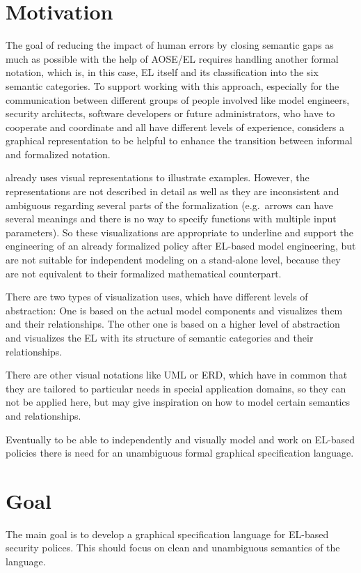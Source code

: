 \documentclass[twoside, openright, 12pt]{book}
\begin{document}
\section{Motivation} 
\label{motivation}
The goal of reducing the impact of human errors by closing semantic gaps as much as possible with the help of AOSE/EL requires handling another formal notation, which is, in this case, EL itself and its classification into the six semantic categories.
To support working with this approach, especially for the communication between different groups of people involved like model engineers, security architects, software developers or future administrators, who have to cooperate and coordinate and all have different levels of experience, \citet*{Amthor18} considers a graphical representation to be helpful to enhance the transition between informal and formalized notation.

\citet*{Amthor18} already uses visual representations to illustrate examples.
However, the representations are not described in detail as well as they are inconsistent and ambiguous regarding several parts of the formalization (e.g.\ arrows can have several meanings and there is no way to specify functions with multiple input parameters).
So these visualizations are appropriate to underline and support the engineering of an already formalized policy after EL-based model engineering, but are not suitable for independent modeling on a stand-alone level, because they are not equivalent to their formalized mathematical counterpart.

There are two types of visualization \cite{Amthor18} uses, which have different levels of abstraction: 
One is based on the actual model components and visualizes them and their relationships.
The other one is based on a higher level of abstraction and visualizes the EL with its structure of semantic categories and their relationships.

There are other visual notations like UML or ERD, which have in common that they are tailored to particular needs in special application domains, so they can not be applied here, but may give inspiration on how to model certain semantics and relationships.

Eventually to be able to independently and visually model and work on EL-based policies there is need for an unambiguous formal graphical specification language.



\section{Goal}
\label{goal}
The main goal is to develop a graphical specification language for EL-based security polices.
This should focus on clean and unambiguous semantics of the language.
\end{document}
